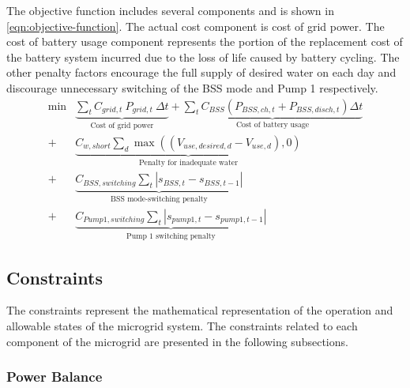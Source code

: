 The objective function includes several components and is shown in \autoref{eqn:objective-function}. The actual cost component is cost of grid power. The cost of battery usage component represents the portion of the replacement cost of the battery system incurred due to the loss of life caused by battery cycling\cite{Yilmaz2020}. The other penalty factors encourage the full supply of desired water on each day and discourage unnecessary switching of the BSS mode and Pump 1 respectively.
%
\begin{equation}
\label{eqn:objective-function}
\begin{split}
\min &\underbrace{\sum_t C_{grid,t} \ P_{grid,t} \ \Delta t}_{\textrm{Cost of grid power}}
+ \underbrace{\sum_t C_{BSS} \left( P_{BSS,ch,t} + P_{BSS,disch,t} \right) \Delta t}_{\textrm{Cost of battery usage}}
\\
+ &\underbrace{C_{w,short} \sum_d \max\left(\left(V_{use,desired,d} - V_{use,d}\right), 0\right)}_{\textrm{Penalty for inadequate water}}
\\
+ &\underbrace{C_{BSS,switching} \sum_t \left| s_{BSS,t} - s_{BSS,t-1} \right|}_{\textrm{BSS mode-switching penalty}}
\\
+ &\underbrace{C_{Pump1,switching} \sum_t \left| s_{pump1,t} - s_{pump1,t-1} \right|}_{\textrm{Pump 1 switching penalty}}
\end{split}
\end{equation}


\subsection{Constraints}

The constraints represent the mathematical representation of the operation and allowable states of the microgrid system. The constraints related to each component of the microgrid are presented in the following subsections.

\subsubsection{Power Balance}

